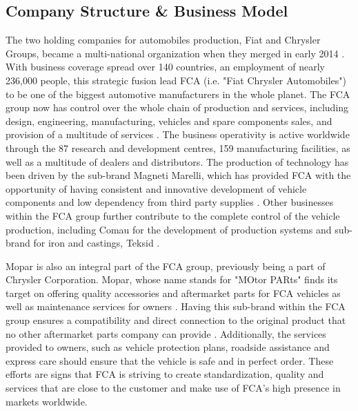 \subsection{Company Structure & Business Model}
The two holding companies for automobiles production, Fiat and Chrysler Groups, became a multi-national organization when they merged in early 2014 \cite{fca_history}. With business coverage spread over 140 countries, an employment of nearly 236,000 people, this strategic fusion lead FCA (i.e. "Fiat Chrysler Automobiles") to be one of the biggest automotive manufacturers in the whole planet. The FCA group now has control over the whole chain of production and services, including design, engineering, manufacturing, vehicles and spare components sales, and provision of a multitude of services \cite{fca_overview}. The business operativity is active worldwide through the 87 research and development centres, 159 manufacturing facilities, as well as a multitude of dealers and distributors. The production of technology has been driven by the sub-brand Magneti Marelli, which has provided FCA with the opportunity of having consistent and innovative development of vehicle components and low dependency from third party supplies \cite{magneti_marelli}. Other businesses within the FCA group further contribute to the complete control of the vehicle production, including Comau for the development of production systems and sub-brand for iron and castings, Teksid \cite{fca_overview}.\n 


Mopar is also an integral part of the FCA group, previously being a part of Chrysler Corporation. Mopar, whose name stands for "MOtor PARts" finds its target on  offering quality accessories and aftermarket parts for FCA vehicles as well as maintenance services for owners \cite{fca_mopar}. Having this sub-brand within the FCA group ensures a compatibility and direct connection to the original product that no other aftermarket parts company can provide \cite{fca_mopar}. Additionally, the services provided to owners, such as vehicle protection plans, roadside assistance and express care should ensure that the vehicle is safe and in perfect order. These efforts are signs that FCA is striving to create standardization, quality and services that are close to the customer and make use of FCA's high presence in markets worldwide. 
 
